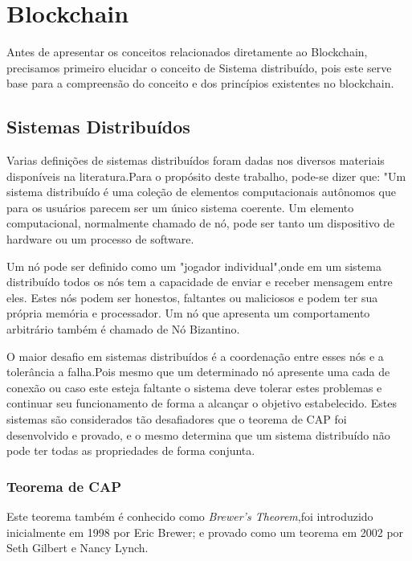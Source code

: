 \section{Blockchain}

    Antes de apresentar os conceitos relacionados diretamente ao Blockchain, precisamos primeiro elucidar o conceito de Sistema distribuído, pois este serve
    base para a compreensão do conceito e dos princípios existentes no blockchain.

\subsection[]{Sistemas Distribuídos}

    Varias definições de sistemas distribuídos foram dadas nos diversos materiais disponíveis na literatura.Para o propósito deste trabalho, pode-se dizer que: "Um sistema distribuído é uma coleção de elementos computacionais autônomos que para os usuários parecem ser um único sistema coerente. Um elemento computacional, normalmente chamado de nó, pode ser tanto um dispositivo de hardware ou um processo de software.\cite{sistemas_distribuidos_tanembaum}

    Um nó pode ser definido como um "jogador individual",onde em um sistema distribuído todos os nós tem a capacidade de enviar e receber mensagem entre eles. Estes nós podem ser honestos, faltantes ou maliciosos e podem ter sua própria memória e processador. Um nó que apresenta um comportamento arbitrário também é chamado de Nó Bizantino.\cite{mastering_blockchain}

    O maior desafio em sistemas distribuídos é a coordenação entre esses nós e a tolerância a falha.Pois mesmo que um determinado nó apresente uma cada de conexão
    ou caso este esteja faltante o sistema deve tolerar estes problemas e continuar seu funcionamento de forma a alcançar o objetivo estabelecido. Estes sistemas 
    são considerados tão desafiadores que o teorema de CAP foi desenvolvido e provado, e o mesmo determina que um sistema distribuído não pode ter todas as propriedades de forma conjunta.

    \subsubsection{Teorema de CAP}

        Este teorema também é conhecido como \textit{Brewer's Theorem},foi introduzido inicialmente em 1998 por Eric Brewer; e provado como um teorema em 2002 por Seth Gilbert e Nancy Lynch.

